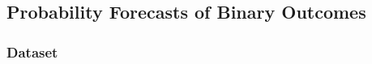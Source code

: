 \documentclass[11pt]{article}
\theoremstyle{definition}
\theoremstyle{definition}
\begin{document}
\subsection{Probability Forecasts of Binary Outcomes}
\label{binaryReal}
\subsubsection{Dataset}
\end{document}
